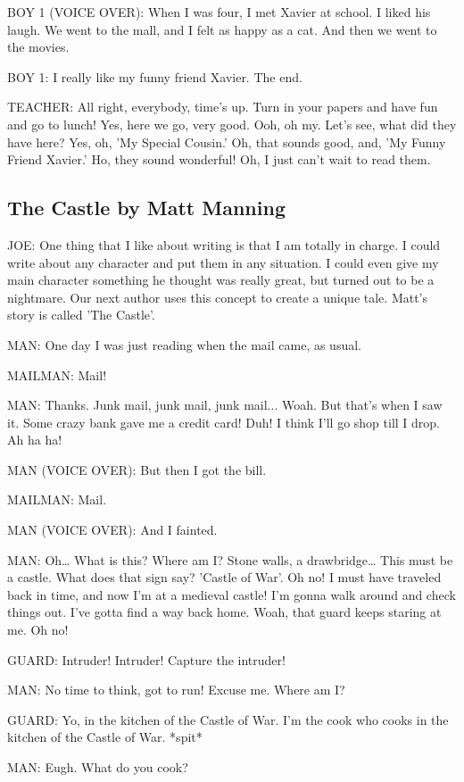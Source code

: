 BOY 1 (VOICE OVER):
When I was four, I met Xavier at school.
I liked his laugh.
We went to the mall, and I felt as happy as a cat.
And then we went to the movies.

BOY 1:
I really like my funny friend Xavier.
The end.

TEACHER:
All right, everybody, time's up.
Turn in your papers and have fun and go to lunch!
Yes, here we go, very good.
Ooh, oh my.
Let's see, what did they have here?
Yes, oh, 'My Special Cousin.'
Oh, that sounds good, and, 'My Funny Friend Xavier.'
Ho, they sound wonderful!
Oh, I just can't wait to read them.

\subsection{The Castle by Matt Manning}

JOE:
One thing that I like about writing is that I am totally in charge.
I could write about any character and put them in any situation.
I could even give my main character something he thought was really great, but turned out to be a nightmare.
Our next author uses this concept to create a unique tale.
Matt's story is called 'The Castle'.

MAN:
One day I was just reading when the mail came, as usual.

MAILMAN:
Mail!

MAN:
Thanks.
Junk mail, junk mail, junk mail...
Woah.
But that's when I saw it.
Some crazy bank gave me a credit card!
Duh!
I think I'll go shop till I drop.
Ah ha ha!

MAN (VOICE OVER):
But then I got the bill.

MAILMAN:
Mail.

MAN (VOICE OVER):
And I fainted.

MAN:
Oh\dots
What is this?
Where am I?
Stone walls, a drawbridge\dots
This must be a castle.
What does that sign say?
'Castle of War'.
Oh no!
I must have traveled back in time, and now I'm at a medieval castle!
I'm gonna walk around and check things out.
I've gotta find a way back home.
Woah, that guard keeps staring at me.
Oh no!

GUARD:
Intruder!
Intruder!
Capture the intruder!

MAN:
No time to think, got to run!
Excuse me.
Where am I?

GUARD:
Yo, in the kitchen of the Castle of War.
I'm the cook who cooks in the kitchen of the Castle of War.
*spit*

MAN:
Eugh.
What do you cook?

